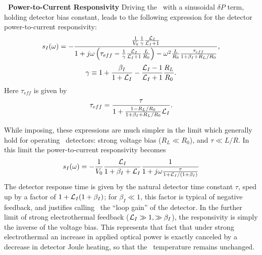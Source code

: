 \textbf{\TES\ Power-to-Current Responsivity}
Driving the \TES\ with a sinusoidal $\delta P$ term, holding detector bias constant, leads to the following expression for the detector power-to-current responsivity:
\begin{equation}\label{eqn:si-full}
s_I(\omega) = 
- \frac{ \frac{1}{V_0} \frac{1}{\gamma} \frac{\mathcal{L}_I}{\mathcal{L}_I + 1} }
       { 1 + j \omega \left( \tau_{eff} - \frac{1}{\gamma}\frac{\mathcal{L}_I}{\mathcal{L}_I + 1} \frac{L}{R_0}\right) - \omega^2 \frac{L}{R_0}\frac{\tau_{eff}}{1 + \beta_I + R_L / R_0}},
\end{equation}
\begin{equation}
\gamma \equiv 1 + \frac{\beta_I}{1+\mathcal{L}_I} - \frac{\mathcal{L}_I - 1}{\mathcal{L}_I + 1}\frac{R_L}{R_0}.
\end{equation}
Here $\tau_{eff}$ is given by
\begin{equation} \label{eqn:teff}
  \tau_{eff} = \frac{\tau}{1 + \frac{1 - R_L / R_0}{1 + \beta_I + R_L / R_0} \mathcal{L}_I}.
\end{equation}

While imposing, these expressions are much simpler in the limit which generally hold for operating \TES\ detectors: strong voltage bias ($R_L \ll R_0$), and $\tau \ll L/R$. 
In this limit the power-to-current responsivity becomes
\begin{equation}
s_I(\omega) = -\frac{1}{V_0} \frac{\mathcal{L}_I}{1+\beta_I + \mathcal{L}_I} \frac{1}{1 + j \omega \frac{\tau}{1 +\mathcal{L}_I/(1+\beta_I)}}
\end{equation}
The detector response time is given by the natural detector time constant $\tau$, sped up by a factor of $1 + \mathcal{L}_I(1+\beta_I)$; for $\beta_I \ll 1$, this factor is typical of negative feedback, and justifies calling \Loop\ the ``loop gain'' of the detector.
In the further limit of strong electrothermal feedback ($\mathcal{L}_I \gg 1, \gg \beta_I$), the \DC responsivity is simply the inverse of the voltage bias.
This represents that fact that under strong electrothermal an increase in applied optical power is exactly canceled by a decrease in detector Joule heating, so that the \TES\ temperature remains unchanged.

